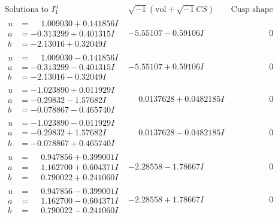 \documentclass[1p]{elsarticle_modified}
\theoremstyle{definition}
\newcommand{\I}{\sqrt{-1}}
\begin{document}
$$\begin{array}{c|c|c}  
\text{Solutions to }I^u_{1}& \I (\text{vol} + \sqrt{-1}CS) & \text{Cusp shape}\\
 \hline 
\begin{aligned}
u &= \phantom{-}1.009030 + 0.141856 I \\
a &= -0.313299 + 0.401315 I \\
b &= -2.13016 + 0.32049 I\end{aligned}
 & -5.55107 - 0.59106 I & \phantom{-0.000000 } 0 \\ \hline\begin{aligned}
u &= \phantom{-}1.009030 - 0.141856 I \\
a &= -0.313299 - 0.401315 I \\
b &= -2.13016 - 0.32049 I\end{aligned}
 & -5.55107 + 0.59106 I & \phantom{-0.000000 } 0 \\ \hline\begin{aligned}
u &= -1.023890 + 0.011929 I \\
a &= -0.29832 - 1.57682 I \\
b &= -0.078867 - 0.465740 I\end{aligned}
 & \phantom{-}0.0137628 + 0.0482185 I & \phantom{-0.000000 } 0 \\ \hline\begin{aligned}
u &= -1.023890 - 0.011929 I \\
a &= -0.29832 + 1.57682 I \\
b &= -0.078867 + 0.465740 I\end{aligned}
 & \phantom{-}0.0137628 - 0.0482185 I & \phantom{-0.000000 } 0 \\ \hline\begin{aligned}
u &= \phantom{-}0.947856 + 0.399001 I \\
a &= \phantom{-}1.162700 + 0.604371 I \\
b &= \phantom{-}0.790022 + 0.241060 I\end{aligned}
 & -2.28558 - 1.78667 I & \phantom{-0.000000 } 0 \\ \hline\begin{aligned}
u &= \phantom{-}0.947856 - 0.399001 I \\
a &= \phantom{-}1.162700 - 0.604371 I \\
b &= \phantom{-}0.790022 - 0.241060 I\end{aligned}
 & -2.28558 + 1.78667 I & \phantom{-0.000000 } 0 \\ \hline\begin{aligned}

\end{aligned}
\end{array}$$
\end{document}
